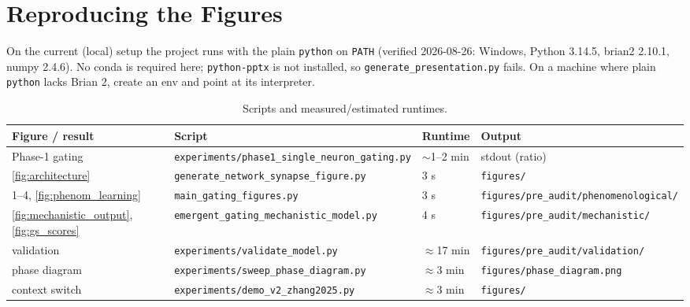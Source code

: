 \documentclass[11pt,a4paper]{article}
\begin{document}
\section{Reproducing the Figures}
On the current (local) setup the project runs with the plain \texttt{python} on
\texttt{PATH} (verified 2026-08-26: Windows, Python 3.14.5, brian2 2.10.1, numpy 2.4.6).
No conda is required here; \texttt{python-pptx} is not installed, so
\texttt{generate\_presentation.py} fails. On a machine where plain \texttt{python} lacks
Brian 2, create an env and point at its interpreter.

\begin{table}[H]
    \centering
    \small
    \begin{tabular}{@{}llll@{}}
    \toprule
    \textbf{Figure / result} & \textbf{Script} & \textbf{Runtime} & \textbf{Output} \\ \midrule
    Phase-1 gating
      & \texttt{experiments/phase1\_single\_neuron\_gating.py} & $\sim$1--2 min & stdout (ratio) \\
    \ref{fig:architecture}
      & \texttt{generate\_network\_synapse\_figure.py} & 3 s & \texttt{figures/} \\
    1--4, \ref{fig:phenom_learning}
      & \texttt{main\_gating\_figures.py} & 3 s & \texttt{figures/pre_audit/phenomenological/} \\
    \ref{fig:mechanistic_output}, \ref{fig:gs_scores}
      & \texttt{emergent\_gating\_mechanistic\_model.py} & 4 s & \texttt{figures/pre_audit/mechanistic/} \\
    validation
      & \texttt{experiments/validate\_model.py} & $\approx$17 min & \texttt{figures/pre_audit/validation/} \\
    phase diagram
      & \texttt{experiments/sweep\_phase\_diagram.py} & $\approx$3 min & \texttt{figures/phase\_diagram.png} \\
    context switch
      & \texttt{experiments/demo\_v2\_zhang2025.py} & $\approx$3 min & \texttt{figures/} \\ \bottomrule
    \end{tabular}
    \caption{Scripts and measured/estimated runtimes.}
\end{table}
\end{document}
